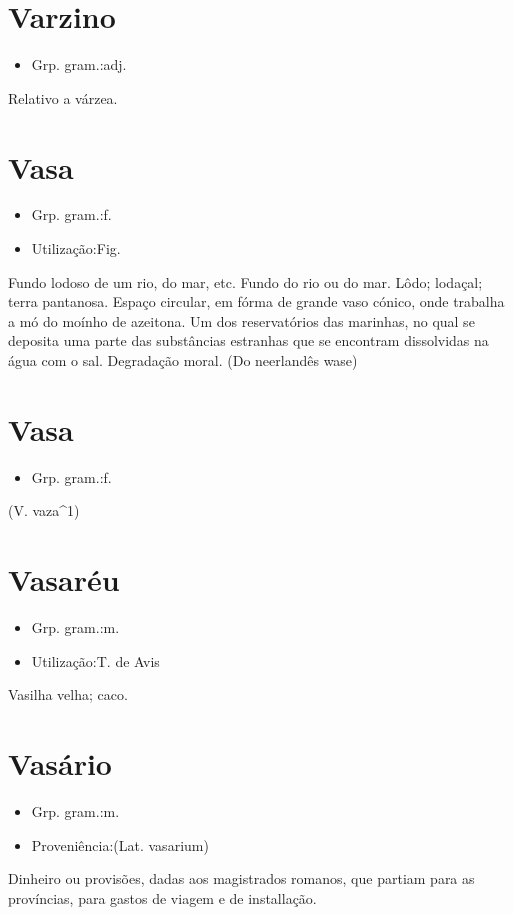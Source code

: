 \documentclass{article}
\begin{document}
\section{Varzino}
\begin{itemize}
\item {Grp. gram.:adj.}
\end{itemize}
Relativo a várzea.
\section{Vasa}
\begin{itemize}
\item {Grp. gram.:f.}
\end{itemize}
\begin{itemize}
\item {Utilização:Fig.}
\end{itemize}
Fundo lodoso de um rio, do mar, etc.
Fundo do rio ou do mar.
Lôdo; lodaçal; terra pantanosa.
Espaço circular, em fórma de grande vaso cónico, onde trabalha a mó do moínho de azeitona.
Um dos reservatórios das marinhas, no qual se deposita uma parte das substâncias estranhas que se encontram dissolvidas na água com o sal.
Degradação moral.
(Do neerlandês \textunderscore wase\textunderscore )
\section{Vasa}
\begin{itemize}
\item {Grp. gram.:f.}
\end{itemize}
(V. \textunderscore vaza\textunderscore ^1)
\section{Vasaréu}
\begin{itemize}
\item {Grp. gram.:m.}
\end{itemize}
\begin{itemize}
\item {Utilização:T. de Avis}
\end{itemize}
Vasilha velha; caco.
\section{Vasário}
\begin{itemize}
\item {Grp. gram.:m.}
\end{itemize}
\begin{itemize}
\item {Proveniência:(Lat. \textunderscore vasarium\textunderscore )}
\end{itemize}
Dinheiro ou provisões, dadas aos magistrados romanos, que partiam para as províncias, para gastos de viagem e de installação.
\end{document}

